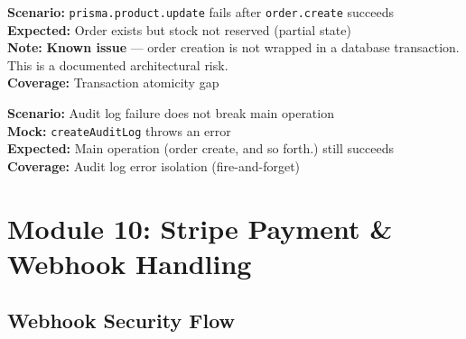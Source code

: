 \documentclass[12pt,a4paper]{report}
\newcommand{\pone}{\textbf{\color{p1red}P1}}
\newcommand{\ptwo}{\textbf{\color{p2orange}P2}}
\begin{document}
\begin{tcolorbox}[criticalbox, title={DB-007 \hfill \pone\ --- Atomicity Gap}]
\textbf{Scenario:} \texttt{prisma.product.update} fails after \texttt{order.create} succeeds \\
\textbf{Expected:} Order exists but stock not reserved (partial state) \\
\textbf{Note:} \textbf{Known issue} --- order creation is not wrapped in a database transaction. \\
This is a documented architectural risk. \\
\textbf{Coverage:} Transaction atomicity gap
\end{tcolorbox}

\begin{tcolorbox}[testbox, title={DB-008 \hfill \ptwo}]
\textbf{Scenario:} Audit log failure does not break main operation \\
\textbf{Mock:} \texttt{createAuditLog} throws an error \\
\textbf{Expected:} Main operation (order create, and so forth.) still succeeds \\
\textbf{Coverage:} Audit log error isolation (fire-and-forget)
\end{tcolorbox}


\chapter{Module 10: Stripe Payment \& Webhook Handling}

\section{Webhook Security Flow}
\end{document}
